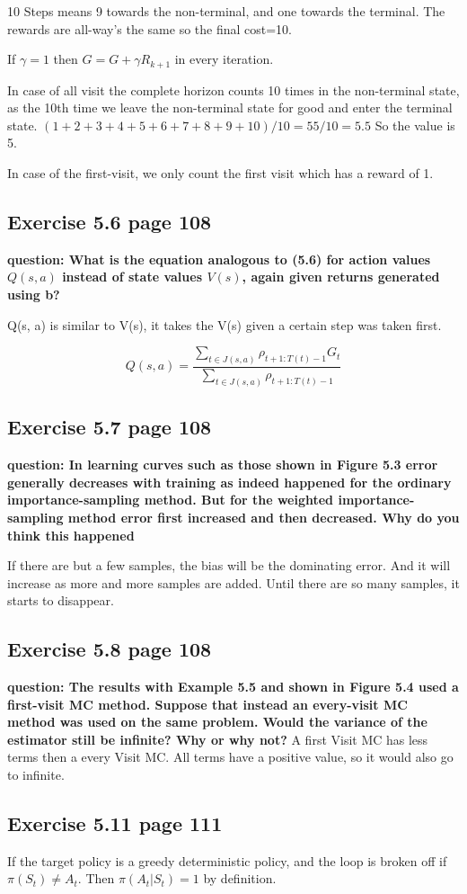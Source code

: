 10 Steps means 9 towards the non-terminal, and one towards the terminal. The rewards are all-way's the same so the final cost=10. 

If $\gamma = 1$ then $G=G+\gamma R_{k+1}$ in every iteration. 

In case of all visit the complete horizon counts 10 times in the non-terminal state, as the 10th time we leave the non-terminal state for good and enter the terminal state. $(1+2+3+4+5+6+7+8+9+10)/10 = 55/10 = 5.5$ So the value is 5.

In case of the first-visit, we only count the first visit which has a reward of 1.

\subsection{Exercise 5.6 page 108}
\textbf{question: What is the equation analogous to (5.6) for action values $Q(s,a)$ instead of state values $V(s)$, again given returns generated using b?}

Q(s, a) is similar to V(s), it takes the V(s) given a certain step was taken first.

\begin{equation}
Q(s, a) = \frac{\sum_{t \in J(s,a)} \rho_{t+1:T(t)-1} G_t }{\sum_{t \in J(s,a)} \rho_{t+1:T(t)-1}}
\end{equation}

\subsection{Exercise 5.7 page 108}
\textbf{question: In learning curves such as those shown in Figure 5.3 error generally decreases with training as indeed happened for the ordinary importance-sampling method. But for the weighted importance-sampling method error first increased and then decreased. Why do you think this happened}

If there are but a few samples, the bias will be the dominating error. And it will increase as more and more samples are added. Until there are so many samples, it starts to disappear.

\subsection{Exercise 5.8 page 108}
\textbf{question: The results with Example 5.5 and shown in Figure 5.4 used a first-visit MC method. Suppose that instead an every-visit MC method was used on the same problem. Would the variance of the estimator still be infinite? Why or why not?}
A first Visit MC has less terms then a every Visit MC. All terms have a positive value, so it would also go to infinite.

\subsection{Exercise 5.11 page 111}
If the target policy is a greedy deterministic policy, and the loop is broken off if $\pi (S_t) \neq A_t$. Then $\pi(A_t|S_t)=1$ by definition.  